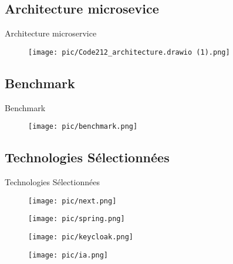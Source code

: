 \documentclass{beamer}
\begin{document}
\subsection{Architecture microsevice}



\begin{frame}{Architecture microservice}
    \begin{figure}[htpb]
        \centering
        \texttt{[image: pic/Code212\_architecture.drawio (1).png]}
    \end{figure}
\end{frame}


\subsection{Benchmark}
\begin{frame}{Benchmark}
    \begin{figure}[htpb]
        \centering
        \texttt{[image: pic/benchmark.png]}
    \end{figure}
\end{frame}


\subsection{Technologies Sélectionnées}
\begin{frame}{Technologies Sélectionnées}
    \begin{figure}[htpb]
        \centering
        \begin{minipage}{0.32\textwidth}
            \centering
            \texttt{[image: pic/next.png]}
        \end{minipage}%
        \hspace{0.03\textwidth}
        \begin{minipage}{0.32\textwidth}
            \centering
            \texttt{[image: pic/spring.png]}
        \end{minipage}%
        \hspace{0.03\textwidth}
        \begin{minipage}{0.32\textwidth}
            \centering
            \texttt{[image: pic/keycloak.png]}
        \end{minipage}
        \hspace{0.03\textwidth}
        \begin{minipage}{0.32\textwidth}
            \centering
            \texttt{[image: pic/ia.png]}
        \end{minipage}
    \end{figure}
\end{frame}
\end{document}
